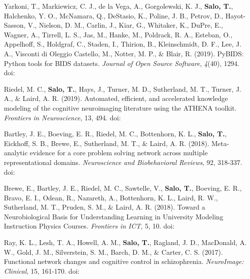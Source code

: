\documentclass[10pt]{article}
\newcommand{\textlink}[3][blue]{\href{#2}{\color{#1}{#3}}}
\begin{document}
\begin{hangparas}{.25in}{1}
	\bigskip

	Yarkoni, T., Markiewicz, C. J., de la Vega, A., Gorgolewski, K. J.,
	\textbf{Salo, T.}, Halchenko, Y. O., McNamara, Q., DeStasio, K.,
	Poline, J. B., Petrov, D., Hayot-Sasson, V., Nielson, D. M., Carlin, J.,
	Kiar, G., Whitaker, K., DuPre, E., Wagner, A., Tirrell, L. S., Jas, M.,
	Hanke, M., Poldrack, R. A., Esteban, O., Appelhoff, S., Holdgraf, C.,
	Staden, I., Thirion, B., Kleinschmidt, D. F., Lee, J. A.,
	Visconti di Oleggio Castello, M., Notter, M. P., \& Blair, R. (2019).
	PyBIDS: Python tools for BIDS datasets.
	\emph{Journal of Open Source Software}, \emph{4}(40), 1294.
	doi:\textlink{https://doi.org/10.21105/joss.01294}{10.21105/joss.01294}

	\bigskip

	Riedel, M. C., \textbf{Salo, T.}, Hays, J., Turner, M. D., Sutherland, M. T.,
	Turner, J. A., \& Laird, A. R. (2019).
	Automated, efficient, and accelerated knowledge modeling of the cognitive
	neuroimaging literature using the ATHENA toolkit.
	\emph{Frontiers in Neuroscience}, 13, 494.
	doi:\textlink{https://www.frontiersin.org/articles/10.3389/fnins.2019.00494/}{10.3389/fnins.2019.00494}

	\bigskip

	Bartley, J. E., Boeving, E. R., Riedel, M. C., Bottenhorn, K. L.,
	\textbf{Salo, T.}, Eickhoff, S. B., Brewe, E., Sutherland, M. T.,
	\& Laird, A. R. (2018).
	Meta-analytic evidence for a core problem solving network across multiple
	representational domains. \emph{Neuroscience and Biobehavioral Reviews}, 92, 318-337.
	doi:\textlink{https://doi.org/10.1016/j.neubiorev.2018.06.009}{10.1016/j.neubiorev.2018.06.009}

	\bigskip

	Brewe, E., Bartley, J. E., Riedel, M. C., Sawtelle, V., \textbf{Salo, T.},
	Boeving, E. R., Bravo, E. I., Odean, R., Nazareth, A., Bottenhorn, K. L.,
	Laird, R. W., Sutherland, M. T., Pruden, S. M., \& Laird, A. R. (2018).
	Toward a Neurobiological Basis for Understanding Learning in University Modeling
	Instruction Physics Courses. \emph{Frontiers in ICT}, 5, 10.
	doi:\textlink{https://doi.org/10.3389/fict.2018.00010}{10.3389/fict.2018.00010}

	\bigskip

	Ray, K. L., Lesh, T. A., Howell, A. M., \textbf{Salo, T.}, Ragland, J. D.,
	MacDonald, A. W., Gold, J. M., Silverstein, S. M., Barch, D. M., \& Carter,
	C. S. (2017). Functional network changes and cognitive control in schizophrenia.
	\emph{NeuroImage: Clinical}, 15, 161-170.
	doi:\textlink{https://doi.org/10.1016/j.nicl.2017.05.001}{10.1016/j.nicl.2017.05.001}


\end{hangparas}
\end{document}
